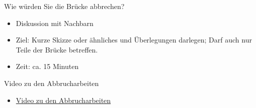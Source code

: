 \begin{frame}{Wie würden Sie die Brücke abbrechen?}
    \begin{itemize}
        \item Diskussion mit Nachbarn
        \item Ziel: Kurze Skizze oder ähnliches und Überlegungen darlegen; Darf auch nur Teile der Brücke betreffen.
        \item Zeit: ca. 15 Minuten
    \end{itemize}
\end{frame}

\begin{frame}{Video zu den Abbrucharbeiten}
    \begin{itemize}
        \item \href{https://www.youtube.com/watch?v=_FJjkKMLzMc}{Video zu den Abbrucharbeiten}
    \end{itemize}
\end{frame}


